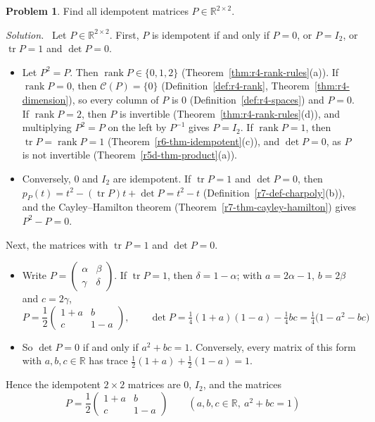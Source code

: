 \documentclass[12pt]{article}
\newcommand{\R}{\mathbb R}
\DeclareMathOperator{\tr}{tr}
\DeclareMathOperator{\rank}{rank}
\theoremstyle{definition}
\newtheorem{problem}{Problem}
\newenvironment{solution}{\par\noindent\textit{Solution.}\ }{\par\smallskip}
\begin{document}
\begin{problem}\label{r7-ex-pr-idempotent-2x2}
Find all idempotent matrices \(P\in\R^{2\times2}\).
\end{problem}
\begin{solution}
Let \(P\in\R^{2\times2}\). First, \(P\) is idempotent if and only if \(P=0\), or \(P=I_2\), or \(\tr P=1\) and
\(\det P=0\).
\begin{itemize}
\item Let \(P^2=P\). Then \(\rank P\in\{0,1,2\}\) (Theorem~\ref{thm:r4-rank-rules}(a)). If \(\rank P=0\), then
\(\mathcal C(P)=\{0\}\) (Definition~\ref{def:r4-rank}, Theorem~\ref{thm:r4-dimension}), so every column of \(P\) is \(0\) (Definition~\ref{def:r4-spaces})
and \(P=0\). If \(\rank P=2\), then \(P\) is invertible (Theorem~\ref{thm:r4-rank-rules}(d)), and multiplying \(P^2=P\)
on the left by \(P^{-1}\) gives \(P=I_2\). If \(\rank P=1\), then \(\tr P=\rank P=1\) (Theorem~\ref{r6-thm-idempotent}(c)),
and \(\det P=0\), as \(P\) is not invertible (Theorem~\ref{r5d-thm-product}(a)).
\item Conversely, \(0\) and \(I_2\) are idempotent. If \(\tr P=1\) and \(\det P=0\), then
\(p_P(t)=t^2-(\tr P)t+\det P=t^2-t\) (Definition~\ref{r7-def-charpoly}(b)), and the Cayley--Hamilton theorem
(Theorem~\ref{r7-thm-cayley-hamilton}) gives \(P^2-P=0\).
\end{itemize}
Next, the matrices with \(\tr P=1\) and \(\det P=0\).
\begin{itemize}
\item Write \(P=\left(\begin{smallmatrix}\alpha&\beta\\\gamma&\delta\end{smallmatrix}\right)\). If \(\tr P=1\), then
\(\delta=1-\alpha\); with \(a=2\alpha-1\), \(b=2\beta\) and \(c=2\gamma\),
\[
P=\frac12\begin{pmatrix}1+a&b\\c&1-a\end{pmatrix},\qquad
\det P=\tfrac14(1+a)(1-a)-\tfrac14bc=\tfrac14\bigl(1-a^2-bc\bigr)
\]
\item So \(\det P=0\) if and only if \(a^2+bc=1\). Conversely, every matrix of this form with \(a,b,c\in\R\) has trace
\(\frac12(1+a)+\frac12(1-a)=1\).
\end{itemize}
Hence the idempotent \(2\times2\) matrices are \(0\), \(I_2\), and the matrices
\[
P=\frac12\begin{pmatrix}1+a&b\\c&1-a\end{pmatrix}\qquad(a,b,c\in\R,\ a^2+bc=1)
\]
\end{solution}
\end{document}
